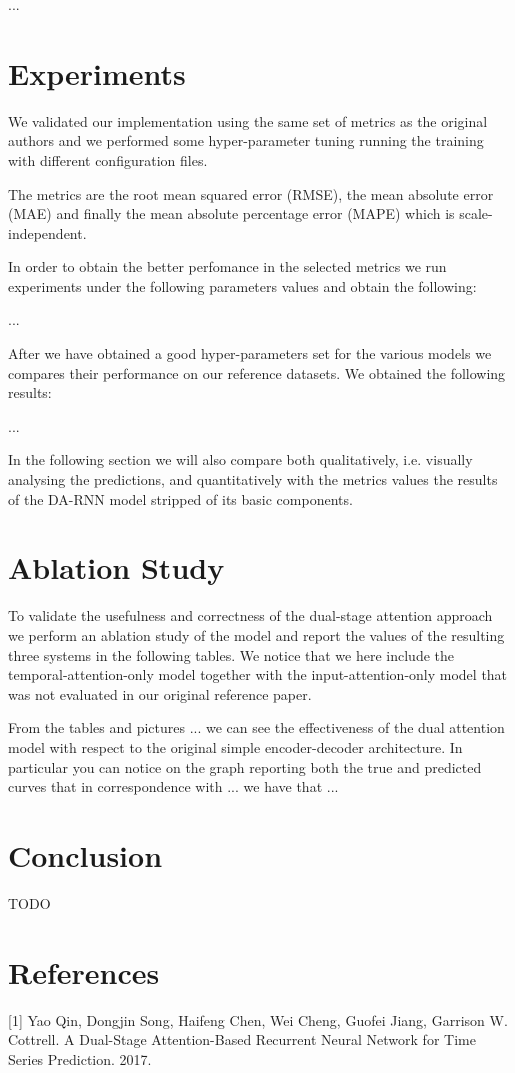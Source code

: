 \documentclass{article}
\begin{document}
...

\section{Experiments}

We validated our implementation using the same set of metrics as the original 
authors and we performed some hyper-parameter tuning running the training with
different configuration files.

The metrics are the root mean squared error (RMSE), the mean absolute error (MAE) 
and finally the mean absolute percentage error (MAPE) which is scale-independent.

In order to obtain the better perfomance in the selected metrics we run
experiments under the following parameters values and obtain the following:

...

After we have obtained a good hyper-parameters set for the various models we 
compares their performance on our reference datasets. We obtained the following 
results:

...

In the following section we will also compare both qualitatively, i.e. visually 
analysing the predictions, and quantitatively with the metrics values the results 
of the DA-RNN model stripped of its basic components.


\section{Ablation Study}

To validate the usefulness and correctness of the dual-stage attention approach we
perform an ablation study of the model and report the values of the resulting 
three systems in the following tables. We notice that we here include the 
temporal-attention-only model together with the input-attention-only model that
was not evaluated in our original reference paper.

From the tables and pictures ...
we can see the effectiveness of the dual attention model with respect to the 
original simple encoder-decoder architecture. In particular you can notice on 
the graph reporting both the true and predicted curves that in correspondence 
with ... we have that ...

\section{Conclusion}

TODO

\section*{References}

\small

[1] Yao Qin, Dongjin Song, Haifeng Chen, Wei Cheng, Guofei Jiang, Garrison W.
Cottrell. A Dual-Stage Attention-Based Recurrent Neural Network for Time Series
Prediction. 2017.
\end{document}
